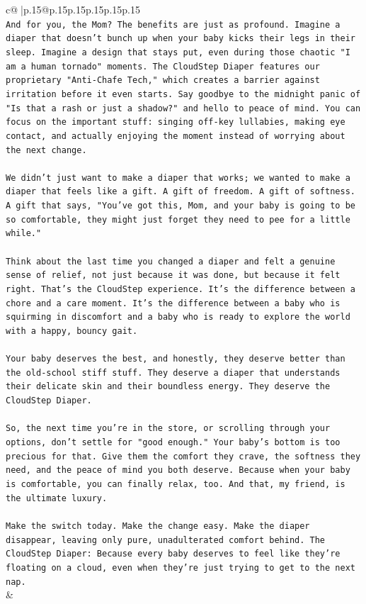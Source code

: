 \documentclass{article}
\begin{document}
{\begin{supertabular}{c@{$\;$}|p{.15\linewidth}@{}p{.15\linewidth}p{.15\linewidth}p{.15\linewidth}p{.15\linewidth}p{.15\linewidth}}
{{{\\ 
\texttt{And for you, the Mom? The benefits are just as profound. Imagine a diaper that doesn't bunch up when your baby kicks their legs in their sleep. Imagine a design that stays put, even during those chaotic "I am a human tornado" moments. The CloudStep Diaper features our proprietary "Anti{-}Chafe Tech," which creates a barrier against irritation before it even starts. Say goodbye to the midnight panic of "Is that a rash or just a shadow?" and hello to peace of mind. You can focus on the important stuff: singing off{-}key lullabies, making eye contact, and actually enjoying the moment instead of worrying about the next change.} \\
\\ 
\texttt{We didn't just want to make a diaper that works; we wanted to make a diaper that feels like a gift. A gift of freedom. A gift of softness. A gift that says, "You've got this, Mom, and your baby is going to be so comfortable, they might just forget they need to pee for a little while."} \\
\\ 
\texttt{Think about the last time you changed a diaper and felt a genuine sense of relief, not just because it was done, but because it felt right. That's the CloudStep experience. It's the difference between a chore and a care moment. It's the difference between a baby who is squirming in discomfort and a baby who is ready to explore the world with a happy, bouncy gait.} \\
\\ 
\texttt{Your baby deserves the best, and honestly, they deserve better than the old{-}school stiff stuff. They deserve a diaper that understands their delicate skin and their boundless energy. They deserve the CloudStep Diaper.} \\
\\ 
\texttt{So, the next time you're in the store, or scrolling through your options, don't settle for "good enough." Your baby's bottom is too precious for that. Give them the comfort they crave, the softness they need, and the peace of mind you both deserve. Because when your baby is comfortable, you can finally relax, too. And that, my friend, is the ultimate luxury.} \\
\\ 
\texttt{Make the switch today. Make the change easy. Make the diaper disappear, leaving only pure, unadulterated comfort behind. The CloudStep Diaper: Because every baby deserves to feel like they're floating on a cloud, even when they're just trying to get to the next nap.} \\
            }
        }
    }
    & \\ \\


\end{supertabular}}
\end{document}
